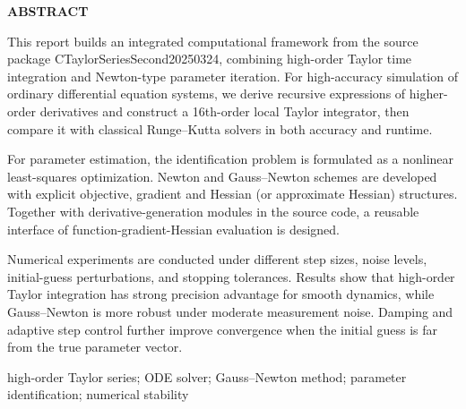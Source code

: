 \thispagestyle{plain}
{}
\centerline{\bfseries ABSTRACT}

\linespread{1.3}\bigskip

This report builds an integrated computational framework from the source package CTaylorSeriesSecond20250324, combining high-order Taylor time integration and Newton-type parameter iteration. For high-accuracy simulation of ordinary differential equation systems, we derive recursive expressions of higher-order derivatives and construct a 16th-order local Taylor integrator, then compare it with classical Runge--Kutta solvers in both accuracy and runtime.

For parameter estimation, the identification problem is formulated as a nonlinear least-squares optimization. Newton and Gauss--Newton schemes are developed with explicit objective, gradient and Hessian (or approximate Hessian) structures. Together with derivative-generation modules in the source code, a reusable interface of function-gradient-Hessian evaluation is designed.

Numerical experiments are conducted under different step sizes, noise levels, initial-guess perturbations, and stopping tolerances. Results show that high-order Taylor integration has strong precision advantage for smooth dynamics, while Gauss--Newton is more robust under moderate measurement noise. Damping and adaptive step control further improve convergence when the initial guess is far from the true parameter vector.

\bigskip
{}
high-order Taylor series; ODE solver; Gauss--Newton method; parameter identification; numerical stability
